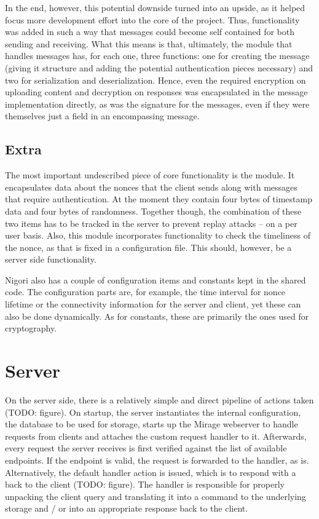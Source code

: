 In the end, however, this potential downside turned into an upside, as it helped focus more development effort into the core of the project.
Thus, functionality was added in such a way that messages could become self contained for both sending and receiving.
What this means is that, ultimately, the module that handles messages has, for each one, three functions: one for creating the message (giving it structure and adding the potential authentication pieces necessary) and two for serialization and deserialization.
Hence, even the required encryption on uploading content and decryption on responses was encapsulated in the message implementation directly, as was the  signature for the messages, even if they were themselves just a field in an encompassing message.

\subsection{Extra}
The most important undescribed piece of core functionality is the  module.
It encapsulates data about the nonces that the client sends along with messages that require authentication.
At the moment they contain four bytes of timestamp data and four bytes of randomness.
Together though, the combination of these two items has to be tracked in the server to prevent replay attacks -- on a per user basis.
Also, this module incorporates functionality to check the timeliness of the nonce, as that is fixed in a configuration file.
This should, however, be a server side functionality.

Nigori also has a couple of configuration items and constants kept in the shared code.
The configuration parts are, for example, the time interval for nonce lifetime or the connectivity information for the server and client, yet these can also be done dynamically.
As for constants, these are primarily the ones used for cryptography.

\section{Server}
On the server side, there is a relatively simple and direct pipeline of actions taken (TODO: figure).
On startup, the server instantiates the internal configuration, the database to be used for storage, starts up the Mirage webserver to handle requests from clients and attaches the custom request handler to it.
Afterwards, every request the server receives is first verified against the list of available endpoints.
If the endpoint is valid, the request is forwarded to the handler, as is.
Alternatively, the default handler action is issued, which is to respond with a  back to the client (TODO: figure).
The handler is responsible for properly unpacking the client query and translating it into a command to the underlying storage and / or into an appropriate response back to the client.

